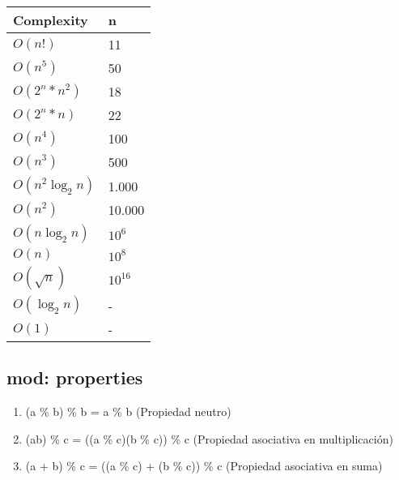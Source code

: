 \documentclass[11pt,letterpaper,twocolumn,twosided]{article}
\begin{document}
\begin{tabular}{|l|l|}
\hline
Complexity & n\\ \hline
$O(n!)$ & 11\\ \hline
$O(n^{5})$ & 50\\ \hline
$O(2^{n}*n^{2})$ & 18\\ \hline
$O(2^{n}*n)$ & 22\\ \hline
$O(n^{4})$ & 100\\ \hline
$O(n^{3})$ & 500\\ \hline
$O(n^{2}\log_{2}n)$ & 1.000\\ \hline
$O(n^{2})$ & 10.000\\ \hline
$O(n\log_{2}n)$ & $10^{6}$\\ \hline
$O(n)$ & $10^{8}$\\ \hline
$O(\sqrt{n})$ & $10^{16}$\\ \hline
$O(\log_{2}n)$ & -\\ \hline
$O(1)$ & -\\ \hline
\end{tabular}


\subsection{mod: properties}

\begin{enumerate}
\item (a \% b) \% b = a \% b (Propiedad neutro)
\item (ab) \% c = ((a \% c)(b \% c)) \% c (Propiedad asociativa en multiplicaci\'on)
\item (a + b) \% c = ((a \% c) + (b \% c)) \% c (Propiedad asociativa en suma)
\end{enumerate}
\end{document}
